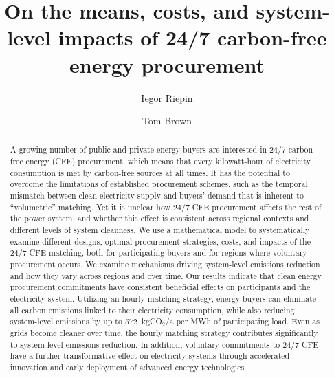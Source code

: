 \documentclass[11pt, 5p, nopreprintline]{elsarticle}
\begin{document}
\begin{frontmatter}

	\title{On the means, costs, and system-level impacts of 24/7 carbon-free energy procurement}

	\author[tubaddress]{Iegor Riepin}
	\author[tubaddress]{Tom Brown}

	\address[tubaddress]{Department of Digital Transformation in Energy Systems, TU Berlin, Germany}

\begin{abstract}

A growing number of public and private energy buyers are interested in 24/7 carbon-free energy (CFE) procurement, which means that every kilowatt-hour of electricity consumption is met by carbon-free sources at all times.
It has the potential to overcome the limitations of established procurement schemes, such as the temporal mismatch between clean electricity supply and buyers' demand that is inherent to \enquote{volumetric} matching.
Yet it is unclear how 24/7 CFE procurement affects the rest of the power system, and whether this effect is consistent across regional contexts and different levels of system cleanness.
We use a mathematical model to systematically examine different designs, optimal procurement strategies, costs, and impacts of the 24/7 CFE matching, both for participating buyers and for regions where voluntary procurement occurs.
We examine mechanisms driving system-level emissions reduction and how they vary across regions and over time.
Our results indicate that clean energy procurement commitments have consistent beneficial effects on participants and the electricity system.
Utilizing an hourly matching strategy, energy buyers can eliminate all carbon emissions linked to their electricity consumption, while also reducing system-level emissions by up to 572~kgCO$_2$/a per MWh of participating load.
Even as grids become cleaner over time, the hourly matching strategy contributes significantly to system-level emissions reduction.
In addition, voluntary commitments to 24/7 CFE have a further transformative effect on electricity systems through accelerated innovation and early deployment of advanced energy technologies.


\end{abstract}
\end{frontmatter}
\end{document}
